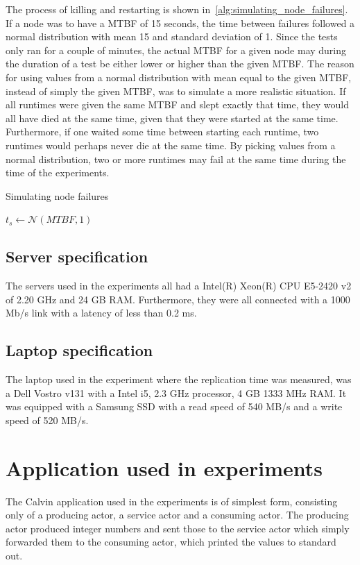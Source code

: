 \documentclass{cslthse-msc}
\begin{document}
The process of killing and restarting is shown in~\cref{alg:simulating_node_failures}. If a node was to have a MTBF of 15 seconds, the time between failures followed a normal distribution with mean 15 and standard deviation of 1. Since the tests only ran for a couple of minutes, the actual MTBF for a given node may during the duration of a test be either lower or higher than the given MTBF. The reason for using values from a normal distribution with mean equal to the given MTBF, instead of simply the given MTBF, was to simulate a more realistic situation. If all runtimes were given the same MTBF and slept exactly that time, they would all have died at the same time, given that they were started at the same time. Furthermore, if one waited some time between starting each runtime, two runtimes would perhaps never die at the same time. By picking values from a normal distribution, two or more runtimes may fail at the same time during the time of the experiments.

\begin{algorithm} 
	\caption{Simulating node failures} \label{alg:simulating_node_failures}
	\begin{algorithmic}[1]
		\State
		\State $t_{s}\gets \mathcal{N} (MTBF,1)$
		\State
		\State
	\EndWhile
	\end{algorithmic}
\end{algorithm}

\subsection{Server specification} \label{sec:server_spec}
The servers used in the experiments all had a Intel(R) Xeon(R) CPU E5-2420 v2 of 2.20 GHz and 24 GB RAM. Furthermore, they were all connected with a 1000 Mb/s link with a latency of less than 0.2 ms. 

\subsection{Laptop specification} \label{sec:laptop_spec}
The laptop used in the experiment where the replication time was measured, was a Dell Vostro v131 with a Intel i5, 2.3 GHz processor, 4 GB 1333 MHz RAM. It was equipped with a Samsung SSD with a read speed of 540 MB/s and a write speed of 520 MB/s. 

\section{Application used in experiments} \label{sec:eval_application}
The Calvin application used in the experiments is of simplest form, consisting only of a producing actor, a service actor and a consuming actor. The producing actor produced integer numbers and sent those to the service actor which simply forwarded them to the consuming actor, which printed the values to standard out. 
\end{document}

